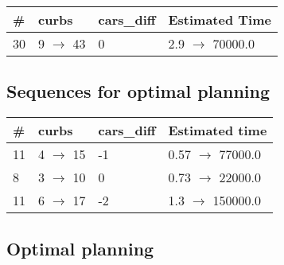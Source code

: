 \documentclass{article}
\begin{document}
                        \begin{center}
                        \begin{tabular}{@{}l|l|l|l@{}}
                        \# & curbs & cars\_diff & Estimated Time\\\midrule
                        30&9 $\rightarrow$ 43&0&2.9 $\rightarrow$ 70000.0
                        \end{tabular}
                        \end{center}
                    
                            \subsection*{Sequences for optimal planning}

                            \begin{center}
                            \begin{tabular}{@{}l|l|l|l@{}}
                            \# & curbs & cars\_diff & Estimated time\\\midrule
                            11&4 $\rightarrow$ 15&-1&0.57 $\rightarrow$ 77000.0\\
8&3 $\rightarrow$ 10&0&0.73 $\rightarrow$ 22000.0\\
11&6 $\rightarrow$ 17&-2&1.3 $\rightarrow$ 150000.0
                            \end{tabular}
                            \end{center}
                    
                                \subsection*{Optimal planning}
                                
\end{document}

